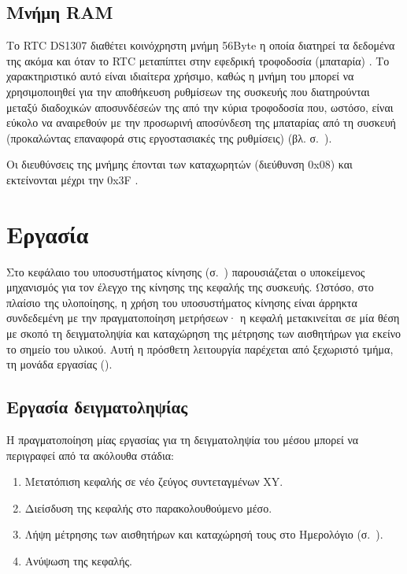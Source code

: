 \subsection{Μνήμη RAM}
\label{subsec:rtc:user-ram}

Το RTC DS1307 διαθέτει κοινόχρηστη μνήμη 56Byte η οποία διατηρεί τα δεδομένα της
ακόμα και όταν το RTC μεταπίπτει στην εφεδρική τροφοδοσία (μπαταρία)
\parencite[1]{ds1307}. Το χαρακτηριστικό αυτό είναι ιδιαίτερα χρήσιμο, καθώς η
μνήμη του μπορεί να χρησιμοποιηθεί για την αποθήκευση ρυθμίσεων της συσκευής που
διατηρούνται μεταξύ διαδοχικών αποσυνδέσεών της από την κύρια τροφοδοσία που,
ωστόσο, είναι εύκολο να αναιρεθούν με την προσωρινή αποσύνδεση της μπαταρίας από
τη συσκευή (προκαλώντας επαναφορά στις εργοστασιακές της ρυθμίσεις) (βλ.
 σ.~\pageref{subsec:backup-memory}).

Οι διευθύνσεις της μνήμης έπονται των καταχωρητών (διεύθυνση 0x08) και
εκτείνονται μέχρι την 0x3F \parencite[8]{ds1307}.



\section{Εργασία}
\label{sec:task}

Στο κεφάλαιο του υποσυστήματος κίνησης (σ.~\pageref{ch:motor})
παρουσιάζεται ο υποκείμενος μηχανισμός για τον έλεγχο της κίνησης της κεφαλής
της συσκευής.
Ωστόσο, στο πλαίσιο της υλοποίησης, η χρήση του υποσυστήματος κίνησης είναι
άρρηκτα συνδεδεμένη με την πραγματοποίηση μετρήσεων· η κεφαλή μετακινείται σε
μία
θέση με σκοπό τη δειγματοληψία και καταχώρηση της μέτρησης των αισθητήρων για
εκείνο το σημείο του υλικού. Αυτή η πρόσθετη λειτουργία παρέχεται από ξεχωριστό
τμήμα, τη μονάδα εργασίας ().


\subsection{Εργασία δειγματοληψίας}

Η πραγματοποίηση μίας εργασίας για τη δειγματοληψία του μέσου μπορεί να
περιγραφεί από τα ακόλουθα στάδια:
\begin{enumerate}
    \item Μετατόπιση κεφαλής σε νέο ζεύγος συντεταγμένων XY.
    \item Διείσδυση της κεφαλής στο παρακολουθούμενο μέσο.
    \item Λήψη μέτρησης των αισθητήρων και καταχώρησή τους στο Ημερολόγιο
    (σ.~\pageref{sec:log}).
    \item Ανύψωση της κεφαλής.
\end{enumerate}

